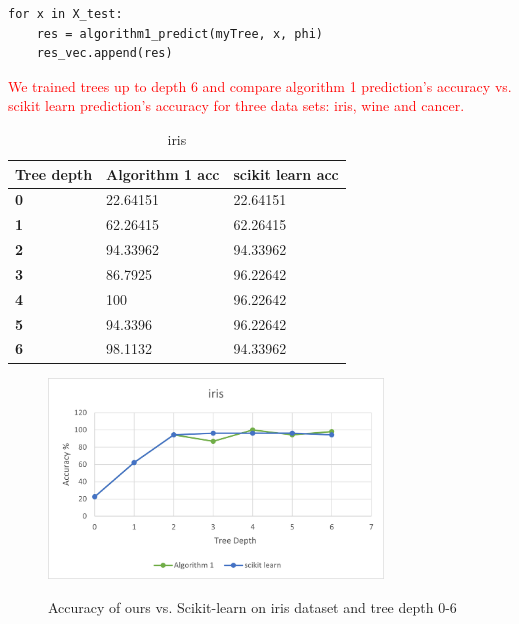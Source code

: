 \documentclass{article}
\begin{document}
\begin{lstlisting}
for x in X_test:
    res = algorithm1_predict(myTree, x, phi)
    res_vec.append(res)
\end{lstlisting}

\newpage
\textcolor{red}{We trained trees up to depth 6 and compare algorithm 1 prediction's accuracy vs. scikit learn prediction's accuracy for three data sets: iris, wine and cancer.}\\

\begin{multicols}{2}

\begin{table}[H]
\caption{ iris}
\label{tab:my-table}
\begin{tabular}{|l|l|l|}


\hline
\textbf{Tree depth} & Algorithm 1 acc & scikit learn acc \\ \hline
\textbf{0} & 22.64151 & 22.64151 \\ \hline
\textbf{1} & 62.26415 & 62.26415 \\ \hline
\textbf{2} & 94.33962 & 94.33962 \\ \hline
\textbf{3} & 86.7925 & 96.22642 \\ \hline
\textbf{4} & 100 & 96.22642 \\ \hline
\textbf{5} & 94.3396 & 96.22642 \\ \hline
\textbf{6} & 98.1132 & 94.33962 \\ \hline
\end{tabular}
\end{table}

\begin{figure}[H]
\centering
\includegraphics[width=3.5in]{iris_acc.png}
\caption{}
\label{fig:label}{Accuracy of ours vs. Scikit-learn on iris dataset and tree depth 0-6}
\end{figure}
\end{multicols}
\end{document}
